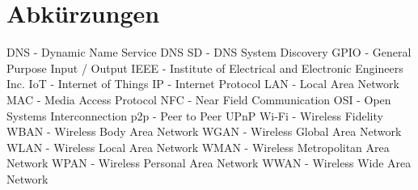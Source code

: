 \documentclass[12pt,a4paper]{article}
\begin{document}
    \section{Abkürzungen}
        DNS - Dynamic Name Service
        DNS SD - DNS System Discovery
        GPIO - General Purpose Input / Output
        IEEE - Institute of Electrical and Electronic Engineers Inc.
        IoT - Internet of Things
        IP - Internet Protocol
        LAN - Local Area Network
        MAC - Media Access Protocol
        NFC - Near Field Communication
        OSI - Open Systems Interconnection
        p2p - Peer to Peer
        UPnP
        Wi-Fi - Wireless Fidelity
        WBAN - Wireless Body Area Network
        WGAN - Wireless Global Area Network
        WLAN - Wireless Local Area Network
        WMAN - Wireless Metropolitan Area Network
        WPAN - Wireless Personal Area Network
        WWAN - Wireless Wide Area Network
\end{document}
